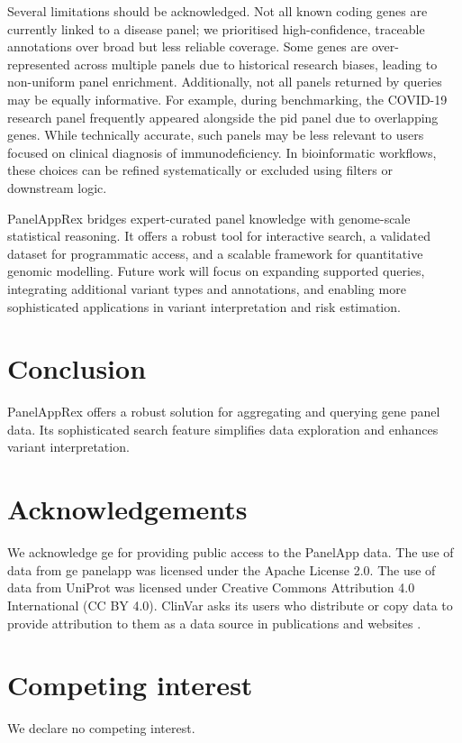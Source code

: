 Several limitations should be acknowledged. Not all known coding genes are currently linked to a disease panel; we prioritised high-confidence, traceable annotations over broad but less reliable coverage. 
Some genes are over-represented across multiple panels due to historical research biases, leading to non-uniform panel enrichment. 
Additionally, not all panels returned by queries may be equally informative. 
For example, during benchmarking, the COVID-19 research panel frequently appeared alongside the \ac{pid} panel due to overlapping genes. 
While technically accurate, such panels may be less relevant to users focused on clinical  diagnosis of immunodeficiency.
In bioinformatic workflows, these choices can be refined systematically or excluded using filters or downstream logic.

PanelAppRex bridges expert-curated panel knowledge with genome-scale statistical reasoning. 
It offers a robust tool for interactive search, a validated dataset for programmatic access, and a scalable framework for quantitative genomic modelling. 
Future work will focus on expanding supported queries, integrating additional variant types and annotations, and enabling more sophisticated applications in variant interpretation and risk estimation.

\section{Conclusion}
\noindent
PanelAppRex offers a robust solution for aggregating and querying gene panel data. Its sophisticated search feature simplifies data exploration and enhances variant interpretation. 

\section*{Acknowledgements}
\noindent
We acknowledge \ac{ge} for providing public access to the PanelApp data.
The use of data from \ac{ge} panelapp was licensed under the Apache License 2.0.
The use of data from UniProt was licensed under Creative Commons Attribution 4.0 International (CC BY 4.0).
ClinVar asks its users who distribute or copy data to provide attribution to them as a data source in publications and websites \cite{landrum_clinvar_2018}.

\section*{Competing interest}
\noindent
We declare no competing interest. 



\clearpage

